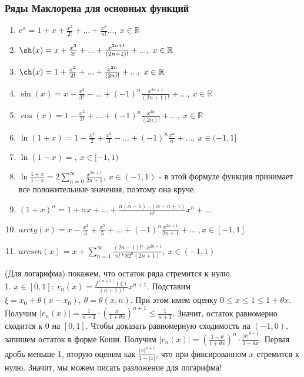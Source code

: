 \subsubsection{Ряды Маклорена для основных функций}
\begin{enumerate}
    \item $e^x=1+x+\frac{x^2}{2!}+...+\frac{x^n}{n!}...,~x\in\mathbb{R}$
\item $\sh(x)=x+\frac{x^3}{3!}+...+\frac{x^{2n+1}}{(2n+1)!}+...,~
x\in\mathbb{R}$
\item $\ch(x)=1+\frac{x^2}{2!}+...+\frac{x^{2n}}{(2n)!}+...,~x\in\mathbb{R}$
\item $\sin(x)=x-\frac{x^3}{3!}-...+(-1)^n\frac{x^{2n+1}}{(2n+1)!}+...,
    ~x\in \mathbb{R}$
\item $\cos(x)=1-\frac{x^2}{2!}+...+(-1)^n \frac{x^{2n}}{(2n)!}+...,~
    x\in\mathbb{R}$ 
\item $\ln(1+x)=1-\frac{x^2}{2}+\frac{x^3}{3}-...+(-1)^n
    \frac{x^n}{n}+...,~x\in(-1,1]$
\item $\ln(1-x)=,~x\in[-1,1)$
\item $\ln \frac{1+x}{1-x}=2 \sum\limits_{n=0}^{\infty} \frac{x^{2n+1}}
    {2n+1},~ x\in(-1,1)$ - в этой формуле функция принимает все положительные
значения, поэтому она круче. 
\item $(1+x)^\alpha=1+\alpha x+...+\frac{\alpha(\alpha-1)...(\alpha-n+1)}
    {n!}x^n+...$
\item $arctg(x)=x-\frac{x^3}{3}+\frac{x^5}{5}+...+(-1)^n \frac{x^{2n+1}}
    {2n+1}+...~,x\in[-1,1]$
\item $arcsin(x)=x+\sum\limits_{n=1}^{\infty} \frac{(2n-1)!!\cdot x^{2n+1}}
    {n!*82^n(2n+1)},~x\in(-1,1)$


\end{enumerate}
(Для логарифма) покажем, что остаток ряда стремится к нулю.\\
1. $x\in[0,1]:~r_n(x)=\frac{f^{(n+1)}(\xi)}{(n+1)!}x^{n+1}$. 
Подставим $\xi=x_0+\theta(x-x_0),~\theta=\theta(x,n)$.
При этом имем оценку $0\leqslant x\leqslant 1\leqslant 1+\theta x$.
Получим
$|r_n(x)|=\frac{1}{n+1}\cdot \left( \frac{x}{1+\theta x} \right)^{n+1}
\leqslant \frac{1}{n+1}$. Значит, остаток равномерно сходится к 0 на $[0,1]$.
Чтобы доказать равномерную сходимость на  $(-1,0)$, запишем остаток в 
форме Коши. Получим  $|r_n(x)|=\left( \frac{1-\theta}{1+\theta x} \right)^n
\cdot \frac{|x|^{n+1}}{1+\theta x}$. Первая дробь меньше 1, вторую 
оценим как $\frac{|x|^{n+1}}{1-{|x|}}$, что при фиксированном $x$ стремится 
к нулю.
Значит, мы можем писать разложение для логарифма!\\
